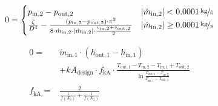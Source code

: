 \begin{equation}
\label{eq:HeatExchanger_zeta2}
0 = \begin{cases}
p_\mathrm{in,2}- p_\mathrm{out,2} & |\dot{m}_\mathrm{in,2}| < \unitfrac[0.0001]{kg}{s} \\
\frac{\zeta}{D^4}-\frac{(p_\mathrm{in,2}-p_\mathrm{out,2})\cdot\pi^2}{8\cdot\dot{m}_\mathrm{in,2}\cdot|\dot{m}_\mathrm{in,2}|\cdot\frac{v_\mathrm{in,2} + v_\mathrm{out,2}}{2}}& |\dot{m}_\mathrm{in,2}| \geq \unitfrac[0.0001]{kg}{s}
\end{cases}
\end{equation}

\begin{equation}
\label{eq:HeatExchanger_kA_char}
\begin{split}
0 = & \dot{m}_\mathrm{in,1} \cdot \left( h_\mathrm{out,1} - h_\mathrm{in,1}\right)\\
&+kA_\mathrm{design} \cdot f_\mathrm{kA} \cdot \frac{T_\mathrm{out,1} - T_\mathrm{in,2} - T_\mathrm{in,1} + T_\mathrm{out,2}}{\ln{\frac{T_\mathrm{out,1} - T_\mathrm{in,2}}{T_\mathrm{in,1} - T_\mathrm{out,2}}}}\\
f_\mathrm{kA}=&\frac{2}{\frac{1}{f\left(X_1\right)}+\frac{1}{f\left(X_2\right)}}\\
\end{split}
\end{equation}

